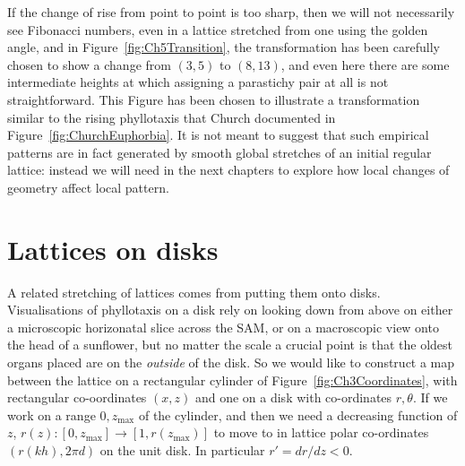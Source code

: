 %
If the change of rise from point to point is too sharp, 
then we will not necessarily see Fibonacci numbers, even in a lattice stretched from one using the golden angle, and in Figure~\ref{fig:Ch5Transition}, the transformation has been carefully chosen to show a change from  $(3,5)$ to $(8,13)$, and even here there are some intermediate heights at which assigning a parastichy pair at all is not straightforward. 
This Figure has been chosen to illustrate a transformation similar to the 
 rising phyllotaxis that Church documented in Figure~\ref{fig:ChurchEuphorbia}. It is not meant to suggest that such empirical patterns are in fact generated by smooth global stretches of an initial regular lattice: instead we will need in the next chapters to explore how local changes of geometry affect local pattern.  


\clearpage
\section{Lattices on disks}
A related stretching of lattices comes from putting them onto disks. 
Visualisations of phyllotaxis on a disk rely on looking down from above on either a microscopic horizonatal slice across the SAM, or on a macroscopic view  onto the head of a sunflower, but no matter the scale a crucial point is that the oldest organs placed are on the \textit{outside} of the disk. 
So we would like to construct a map between the lattice on a rectangular cylinder of Figure~\ref{fig:Ch3Coordinates}, with rectangular co-oordinates $(x,z)$ and one on a disk with co-ordinates $r,\theta$. If we work on a  range $0,z_{\text{max}}$ of the cylinder, and then we need a decreasing function of $z$, $r(z):[ 0,z_{\text{max}}]\rightarrow[ 1, r(z_{\text{max}})]$ to move to in lattice polar co-ordinates $(r(k h),2\pi d)$ on the unit disk. In particular $r'=dr/dz<0$. 

